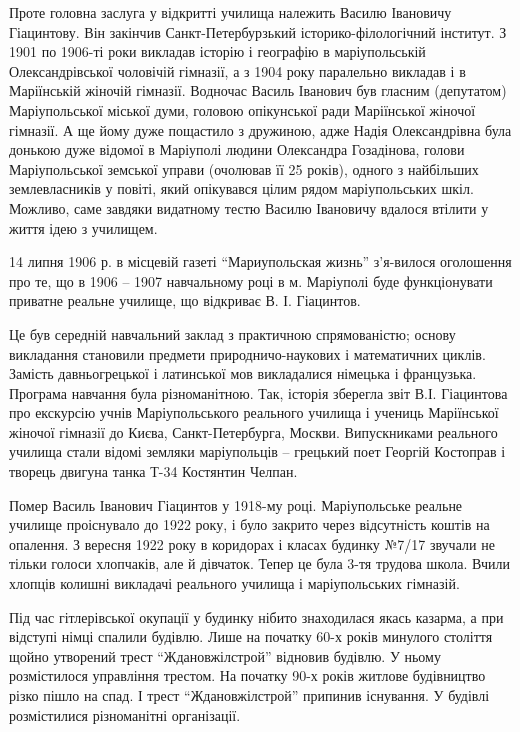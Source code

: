 
Проте головна заслуга у відкритті училища належить Василю Івановичу Гіацинтову.
Він закінчив Санкт-Петербурзький історико-філологічний інститут. З 1901 по
1906-ті роки викладав історію і географію в маріупольській Олександрівської
чоловічій гімназії, а з 1904 року паралельно викладав і в Маріїнській жіночій
гімназії. Водночас Василь Іванович був гласним (депутатом) Маріупольської
міської думи, головою опікунської ради Маріїнської жіночої гімназії. А ще йому
дуже пощастило з дружиною, адже Надія Олександрівна була донькою дуже відомої в
Маріуполі людини Олександра Гозадінова, голови Маріупольської земської управи
(очолював її 25 років), одного з найбільших землевласників у повіті, який
опікувався цілим рядом маріупольських шкіл. Можливо, саме завдяки видатному
тестю Василю Івановичу вдалося втілити у життя ідею з училищем.

14 липня 1906 р. в місцевій газеті \enquote{Мариупольская жизнь} з'я\hyp{}вилося
оголошення про те, що в 1906 – 1907 навчальному році в м. Маріуполі буде
функціонувати приватне реальне училище, що відкриває В. І. Гіацинтов.


Це був середній навчальний заклад з практичною спрямованістю; основу викладання
становили предмети природничо-наукових і математичних циклів. Замість
давньогрецької і латинської мов викладалися німецька і французька. Програма
навчання була різноманітною. Так, історія зберегла звіт В.І. Гіацинтова про
екскурсію учнів Маріупольського реального училища і учениць Маріїнської жіночої
гімназії до Києва, Санкт-Петербурга, Москви.  Випускниками реального училища
стали відомі земляки маріупольців – грецький поет Георгій Костоправ і творець
двигуна танка Т-34 Костянтин Челпан.


Помер Василь Іванович Гіацинтов у 1918-му році. Маріупольське реальне училище
проіснувало до 1922 року, і було закрито через відсутність коштів на опалення.
З вересня 1922 року в коридорах і класах будинку №7/17 звучали не тільки голоси
хлопчаків, але й дівчаток. Тепер це була 3-тя трудова школа. Вчили хлопців
колишні викладачі реального училища і маріупольських гімназій.

Під час гітлерівської окупації у будинку нібито знаходилася якась казарма, а
при відступі німці спалили будівлю. Лише на початку 60-х років минулого
століття щойно утворений трест \enquote{Ждановжілстрой} відновив будівлю. У ньому
розмістилося управління трестом. На початку 90-х років житлове будівництво
різко пішло на спад. І трест \enquote{Ждановжілстрой} припинив існування. У будівлі
розмістилися різноманітні організації. 

